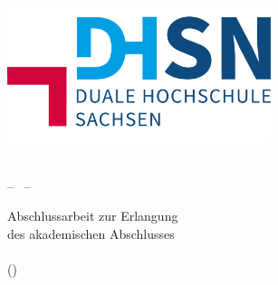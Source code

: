 \thispagestyle{empty}
\begin{titlepage}

	\vspace{1cm}
	\begin{center}
		\hspace*{-2cm}
		\includegraphics[width=7.7cm]{figures/CD/DHSN-Logo} \\ 
	\end{center}

	\begin{center}
		\vspace{0.1cm}
		\huge \textbf{\myAcademy}\\
		\vspace{0.4cm}
		\LARGE -- \myStudy\ --
	\end{center}

	\vfill


	\vfill

	\begin{center}
		\LARGE \textbf{\myTitle}
		\ifdef{\mySubtitle}{\vspace{0.2cm}\\ \large \mySubtitle}{}
	\end{center} 

	\vfill
	\vfill

	\begin{center}
		\Large Abschlussarbeit zur Erlangung\\des akademischen Abschlusses\\
		\vspace{0.3cm}
		\Large\myDegree\\
		\small(\myDegreeShort)
	\end{center}


\end{titlepage}

